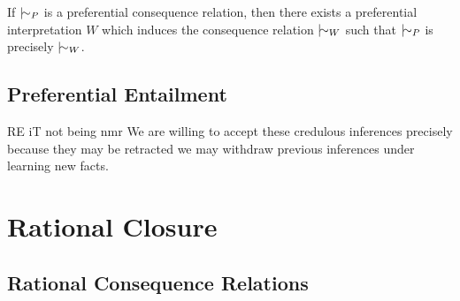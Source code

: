 \begin{theorem}[Completeness]
  \label{theorem:completeness-preferential} If $\twiddle_{P}$ is a preferential consequence relation, then there exists a preferential
  interpretation $W$ which induces the consequence relation $\twiddle_{W}$ such that $\twiddle_{P}$ is precisely $\twiddle_{W}$.
\end{theorem}

\subsection{Preferential Entailment}

RE iT not being nmr We are willing to accept these credulous inferences precisely because they may be retracted we may withdraw previous
inferences under learning new facts.

\section{Rational Closure}

\subsection{Rational Consequence Relations}